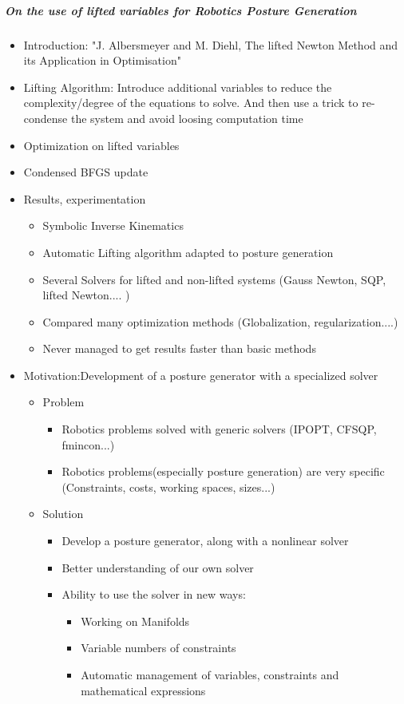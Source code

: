 \documentclass{article}
\begin{document}
\subparagraph{On the use of lifted variables for Robotics Posture Generation}
\begin{itemize}
  \item {Introduction: "J. Albersmeyer and M. Diehl, The lifted Newton Method and its Application in Optimisation"}
  \item {Lifting Algorithm: Introduce additional variables to reduce the complexity/degree of the equations to solve. And then use a trick to re-condense the system and avoid loosing computation time}
  \item {Optimization on lifted variables}
  \item {Condensed BFGS update}
  \item {Results, experimentation}
  \begin{itemize}
    \item Symbolic Inverse Kinematics
    \item Automatic Lifting algorithm adapted to posture generation
    \item Several Solvers for lifted and non-lifted systems (Gauss Newton, SQP, lifted Newton.... )
    \item Compared many optimization methods (Globalization, regularization....)
    \item Never managed to get results faster than basic methods
  \end{itemize}
  \item{Motivation:Development of a posture generator with a specialized solver}
    \begin{itemize}
      \item Problem
        \begin{itemize}
          \item Robotics problems solved with generic solvers (IPOPT, CFSQP, fmincon...)
          \item Robotics problems(especially posture generation) are very specific (Constraints, costs, working spaces, sizes...)
        \end{itemize}
      \item Solution
        \begin{itemize}
          \item Develop a posture generator, along with a nonlinear solver
          \item Better understanding of our own solver
          \item Ability to use the solver in new ways:
          \begin{itemize}
            \item Working on Manifolds
            \item Variable numbers of constraints
            \item Automatic management of variables, constraints and mathematical expressions
          \end{itemize}
        \end{itemize}
    \end{itemize}
\end{itemize}
\end{document}
